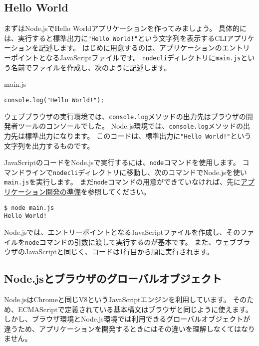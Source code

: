 \hypertarget{hello-world}{%
\subsection{Hello World}\label{hello-world}}

まずはNode.jsでHello Worldアプリケーションを作ってみましょう。
具体的には、実行すると標準出力に\texttt{"Hello World!"}という文字列を表示するCLIアプリケーションを記述します。
はじめに用意するのは、アプリケーションのエントリーポイントとなるJavaScriptファイルです。
\texttt{nodecli}ディレクトリに\texttt{main.js}という名前でファイルを作成し、次のように記述します。

\begin{listtitle}
main.js
\end{listtitle}
\begin{lstlisting}
console.log("Hello World!");
\end{lstlisting}
\listend

ウェブブラウザの実行環境では、\texttt{console.log}メソッドの出力先はブラウザの開発者ツールのコンソールでした。
Node.js環境では、\texttt{console.log}メソッドの出力先は標準出力になります。
このコードは、標準出力に\texttt{"Hello World!"}という文字列を出力するものです。

JavaScriptのコードをNode.jsで実行するには、\texttt{node}コマンドを使用します。
コマンドラインで\texttt{nodecli}ディレクトリに移動し、次のコマンドでNode.jsを使い\texttt{main.js}を実行します。
まだ\texttt{node}コマンドの用意ができていなければ、先に\href{../../setup-local-env/README.md}{アプリケーション開発の準備}を参照してください。

\begin{lstlisting}
$ node main.js
Hello World!
\end{lstlisting}

Node.jsでは、エントリーポイントとなるJavaScriptファイルを作成し、そのファイルを\texttt{node}コマンドの引数に渡して実行するのが基本です。
また、ウェブブラウザのJavaScriptと同じく、コードは1行目から順に実行されます。

\hypertarget{global-objects}{%
\subsection{Node.jsとブラウザのグローバルオブジェクト}\label{global-objects}}

Node.jsはChromeと同じV8というJavaScriptエンジンを利用しています。
そのため、ECMAScriptで定義されている基本構文はブラウザと同じように使えます。
しかし、ブラウザ環境とNode.js環境では利用できるグローバルオブジェクトが違うため、アプリケーションを開発するときにはその違いを理解しなくてはなりません。

